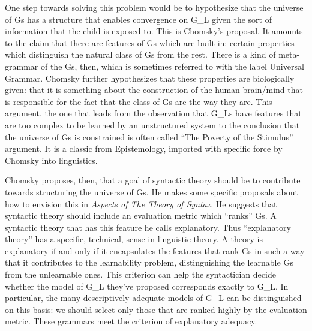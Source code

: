 \clearpage
One step towards solving this problem would be to hypothesize that the universe of Gs has a structure that enables convergence on G_L given the sort of information that the child is exposed to. This is Chomsky's proposal. It amounts to the claim that there are features of Gs which are built-in: certain properties which distinguish the natural class of Gs from the rest. There is a kind of meta-grammar of the Gs, then, which is sometimes referred to with the label Universal Grammar. Chomsky further hypothesizes that these properties are biologically given: that it is something about the construction of the human brain/mind that is responsible for the fact that the class of Gs are the way they are. This argument, the one that leads from the observation that G_Ls have features that are too complex to be learned by an unstructured system to the conclusion that the universe of Gs is constrained is often called ``The Poverty of the Stimulus'' argument. It is a classic from Epistemology, imported with specific force by Chomsky into linguistics.

Chomsky proposes, then, that a goal of syntactic theory should be to contribute towards structuring the universe of Gs. He makes some specific proposals about how to envision this in \textit{Aspects of The Theory of Syntax}\nocite{Chomsky:1965}. He suggests that syntactic theory should include an evaluation metric which ``ranks'' Gs. A syntactic theory that has this feature he calls explanatory. Thus ``explanatory theory'' has a specific, technical, sense in linguistic theory. A theory is explanatory if and only if it encapsulates the features that rank Gs in such a way that it contributes to the learnability problem, distinguishing the learnable Gs from the unlearnable ones. This criterion can help the syntactician decide whether the model of G_L they've proposed corresponds exactly to G_L. In particular, the many descriptively adequate models of G_L can be distinguished on this basis: we should select only those that are ranked highly by the evaluation metric. These grammars meet the criterion of explanatory adequacy.

